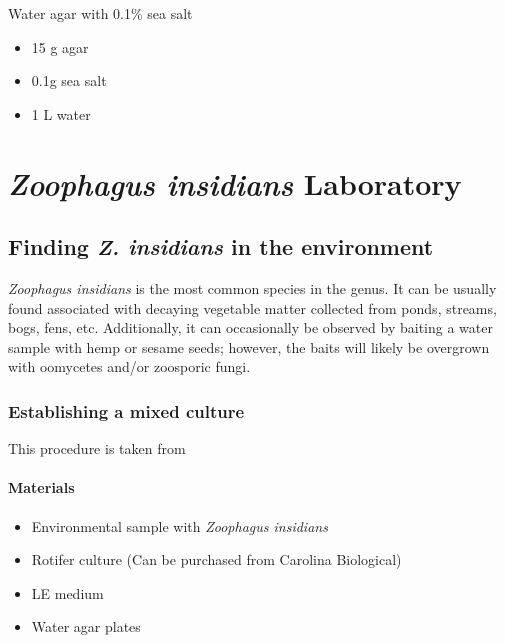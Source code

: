 \documentclass[]{book}
\providecommand{\tightlist}{%
  \setlength{\itemsep}{0pt}\setlength{\parskip}{0pt}}
\let\oldparagraph\paragraph
\renewcommand{\paragraph}[1]{\oldparagraph{#1}\mbox{}}
\begin{document}
{Water agar with 0.1\% sea salt}

\begin{itemize}
\tightlist
\item
  15 g agar
\item
  0.1g sea salt
\item
  1 L water
\end{itemize}

\hypertarget{zoophagus-insidians-laboratory}{%
\section{\texorpdfstring{\emph{Zoophagus insidians} Laboratory}{Zoophagus insidians Laboratory}}\label{zoophagus-insidians-laboratory}}

\hypertarget{finding-z.-insidians-in-the-environment}{%
\subsection{\texorpdfstring{Finding \emph{Z. insidians} in the environment}{Finding Z. insidians in the environment}}\label{finding-z.-insidians-in-the-environment}}

\emph{Zoophagus insidians} is the most common species in the genus. It can be usually found associated with decaying vegetable matter collected from ponds, streams, bogs, fens, etc. Additionally, it can occasionally be observed by baiting a water sample with hemp or sesame seeds; however, the baits will likely be overgrown with oomycetes and/or zoosporic fungi.

\hypertarget{establishing-a-mixed-culture-1}{%
\subsubsection{Establishing a mixed culture}\label{establishing-a-mixed-culture-1}}

This procedure is taken from \citet{Tanabe_2000}

\hypertarget{materials-2}{%
\paragraph{Materials}\label{materials-2}}

\begin{itemize}
\tightlist
\item
  Environmental sample with \emph{Zoophagus insidians}
\item
  Rotifer culture (Can be purchased from Carolina Biological)
\item
  LE medium
\item
  Water agar plates
\end{itemize}
\end{document}
